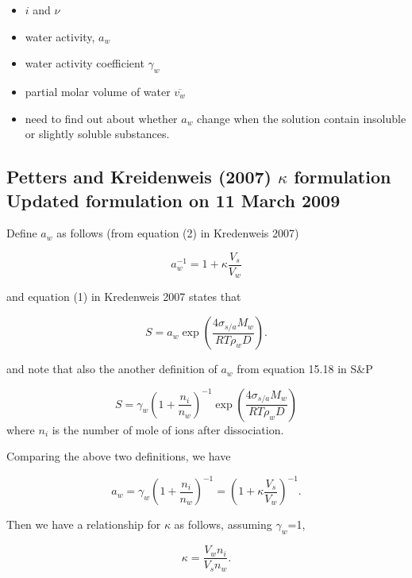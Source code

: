 \documentclass[12pt]{article}
\begin{document}
\begin{itemize}

\item $i$ and $\nu$
\item water activity, $a_{w}$
\item water activity coefficient $\gamma_{w}$
\item partial molar volume of water $\overline{v_{w}}$
\item need to find out about whether $a_{w}$ change when the solution contain insoluble or slightly soluble substances.

\end{itemize}

\subsection{Petters and Kreidenweis (2007) $\kappa$ formulation Updated formulation on 11 March 2009}

Define $a_{w}$ as follows (from equation (2) in Kredenweis 2007)

\begin{equation}\label{eqn:1}
a_{w}^{-1}=1+\kappa \frac{V_s}{V_w}
\end{equation}

and equation (1) in Kredenweis 2007 states that

\begin{equation}
S=a_{w} \exp (\frac{4 \sigma_{s/a} M_{w}} {RT\rho_wD}).
\end{equation}

and note that also the another definition of $a_{w}$ from equation 15.18 in S\&P

\begin{equation}
S=\gamma_{w}(1+ \frac{n_{i}}{n_{w}})^{-1}\exp (\frac{4 \sigma_{s/a} M_{w}} {RT\rho_wD})
\end{equation}
where $n_{i}$ is the number of mole of ions after dissociation.

Comparing the above two definitions, we have

\begin{equation}
a_{w}=\gamma_{w}(1+\frac{n_{i}}{n_{w}})^{-1}=(1+\kappa \frac{V_{s}}{V_{w}})^{-1}.
\end{equation}

Then we have a relationship for $\kappa$ as follows, assuming $\gamma_{w}$=1, 

\begin{equation}
\kappa= \frac{V_{w} n_{i}}{V_{s} n_{w}}.
\end{equation}
\end{document}

